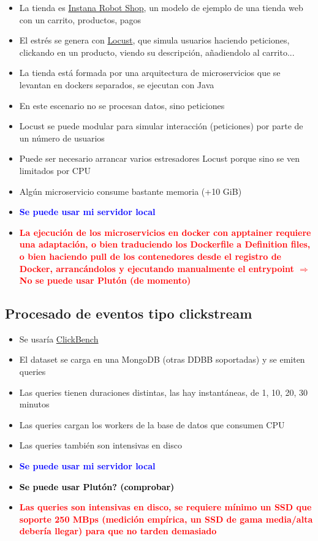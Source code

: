 \documentclass[preprint,3p]{elsarticle}
\begin{document}
\begin{itemize}
	\item La tienda es \href{https://github.com/instana/robot-shop}{Instana Robot Shop}, un modelo de ejemplo de una tienda web con un carrito, productos, pagos
	\item El estrés se genera con \href{https://locust.io/}{Locust}, que simula usuarios haciendo peticiones, clickando en un producto, viendo su descripción, añadiendolo al carrito...
	\item La tienda está formada por una arquitectura de microservicios que se levantan en dockers separados, se ejecutan con Java
	\item En este escenario no se procesan datos, sino peticiones
	\item Locust se puede modular para simular interacción (peticiones) por parte de un número de usuarios
	\item Puede ser necesario arrancar varios estresadores Locust porque sino se ven limitados por CPU
	\item Algún microservicio consume bastante memoria (+10 GiB)
	\item \textcolor{blue}{\textbf{Se puede usar mi servidor local}}
	\item \textcolor{red}{\textbf{La ejecución de los microservicios en docker con apptainer requiere una adaptación, o bien traduciendo los Dockerfile a Definition files, o bien haciendo pull de los contenedores desde el registro de Docker, arrancándolos y ejecutando manualmente el entrypoint $\Rightarrow$ No se puede usar Plutón (de momento)}}
\end{itemize}




\subsection{Procesado de eventos tipo clickstream}

\begin{itemize}
	\item Se usaría \href{https://github.com/ClickHouse/ClickBench}{ClickBench}
	\item El dataset se carga en una MongoDB (otras DDBB soportadas) y se emiten queries
	\item Las queries tienen duraciones distintas, las hay instantáneas, de 1, 10, 20, 30 minutos
	\item Las queries cargan los workers de la base de datos que consumen CPU
	\item Las queries también son intensivas en disco 
	\item \textcolor{blue}{\textbf{Se puede usar mi servidor local}}
	\item \textcolor{black}{\textbf{Se puede usar Plutón? (comprobar)}}
	\item \textcolor{red}{\textbf{Las queries son intensivas en disco, se requiere mínimo un SSD que soporte 250 MBps (medición empírica, un SSD de gama media/alta debería llegar) para que no tarden demasiado}}
\end{itemize}
\end{document}
